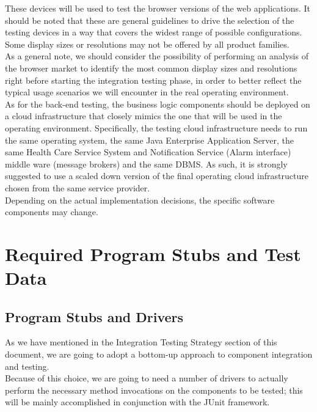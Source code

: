 \documentclass[a4paper, hidelinks, 12pt]{report}
\begin{document}
	These devices will be used to test the browser versions of the web applications. It should be noted that these are general guidelines to drive the selection of the testing devices in a way that covers the widest range of possible configurations. Some display sizes or resolutions may not be offered by all product families.\\
	
	As a general note, we should consider the possibility of performing an analysis of the browser market to identify the most common display sizes and resolutions right before starting the integration testing phase, in order to better reflect the typical usage scenarios we will encounter in the real operating environment.\\
	
	As for the back-end testing, the business logic components should be deployed on a cloud infrastructure that closely mimics the one that will be used in the operating environment. Specifically, the testing cloud infrastructure needs to run the same operating system, the same Java Enterprise Application Server, the same Health Care Service System and Notification Service (Alarm interface) middle ware (message brokers) and the same DBMS. As such, it is strongly suggested to use a scaled down version of the final operating cloud infrastructure chosen from the same service provider.\\
	
	Depending on the actual implementation decisions, the specific software components may change.

	\chapter{Required Program Stubs and Test Data}
	\section{Program Stubs and Drivers}
	As we have mentioned in the Integration Testing Strategy section of this document, we are going to adopt a bottom-up approach to component integration and testing.\\
	
	Because of this choice, we are going to need a number of drivers to actually perform the necessary method invocations on the components to be tested; this will be mainly accomplished in conjunction with the JUnit framework.\\
	
\end{document}
